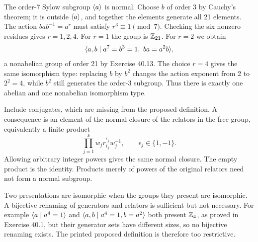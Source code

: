 The order-7 Sylow subgroup $\langle a\rangle$ is normal. Choose $b$ of order 3 by Cauchy's theorem; it is outside $\langle a\rangle$, and together the elements generate all 21 elements.
The action $bab^{-1}=a^r$ must satisfy $r^3\equiv1\pmod7$. Checking the six nonzero residues gives $r=1,2,4$.
For $r=1$ the group is $\mathbb{Z}_{21}$. For $r=2$ we obtain
\[
\gen{a,b\mid a^7=b^3=1,\ ba=a^2b},
\]
a nonabelian group of order 21 by Exercise 40.13. The choice $r=4$ gives the same isomorphism type: replacing $b$ by $b^2$ changes the action exponent from 2 to $2^2=4$, while $b^2$ still generates the order-3 subgroup. Thus there is exactly one abelian and one nonabelian isomorphism type.

Include conjugates, which are missing from the proposed definition. A consequence is an element of the normal closure of the relators in the free group, equivalently a finite product
\[
\prod_{j=1}^k w_j r_{i_j}^{\epsilon_j}w_j^{-1},
\qquad\epsilon_j\in\{1,-1\}.
\]
Allowing arbitrary integer powers gives the same normal closure. The empty product is the identity. Products merely of powers of the original relators need not form a normal subgroup.

Two presentations are isomorphic when the groups they present are isomorphic. A bijective renaming of generators and relators is sufficient but not necessary.
For example $\langle a\mid a^4=1\rangle$ and $\langle a,b\mid a^4=1,b=a^2\rangle$ both present $\mathbb{Z}_4$, as proved in Exercise 40.1, but their generator sets have different sizes, so no bijective renaming exists. The printed proposed definition is therefore too restrictive.

